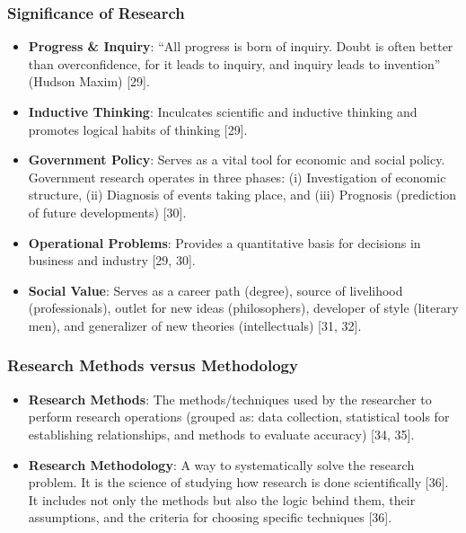 \documentclass[
]{article}
\providecommand{\tightlist}{%
  \setlength{\itemsep}{0pt}\setlength{\parskip}{0pt}}
\begin{document}
\subsubsection{Significance of Research}\label{significance-of-research}

\begin{itemize}
\tightlist
\item
  \textbf{Progress \& Inquiry}: ``All progress is born of inquiry. Doubt
  is often better than overconfidence, for it leads to inquiry, and
  inquiry leads to invention'' (Hudson Maxim) {[}29{]}.
\item
  \textbf{Inductive Thinking}: Inculcates scientific and inductive
  thinking and promotes logical habits of thinking {[}29{]}.
\item
  \textbf{Government Policy}: Serves as a vital tool for economic and
  social policy. Government research operates in three phases: (i)
  Investigation of economic structure, (ii) Diagnosis of events taking
  place, and (iii) Prognosis (prediction of future developments)
  {[}30{]}.
\item
  \textbf{Operational Problems}: Provides a quantitative basis for
  decisions in business and industry {[}29, 30{]}.
\item
  \textbf{Social Value}: Serves as a career path (degree), source of
  livelihood (professionals), outlet for new ideas (philosophers),
  developer of style (literary men), and generalizer of new theories
  (intellectuals) {[}31, 32{]}.
\end{itemize}

\subsubsection{Research Methods versus
Methodology}\label{research-methods-versus-methodology}

\begin{itemize}
\tightlist
\item
  \textbf{Research Methods}: The methods/techniques used by the
  researcher to perform research operations (grouped as: data
  collection, statistical tools for establishing relationships, and
  methods to evaluate accuracy) {[}34, 35{]}.
\item
  \textbf{Research Methodology}: A way to systematically solve the
  research problem. It is the science of studying how research is done
  scientifically {[}36{]}. It includes not only the methods but also the
  logic behind them, their assumptions, and the criteria for choosing
  specific techniques {[}36{]}.
\end{itemize}
\end{document}
